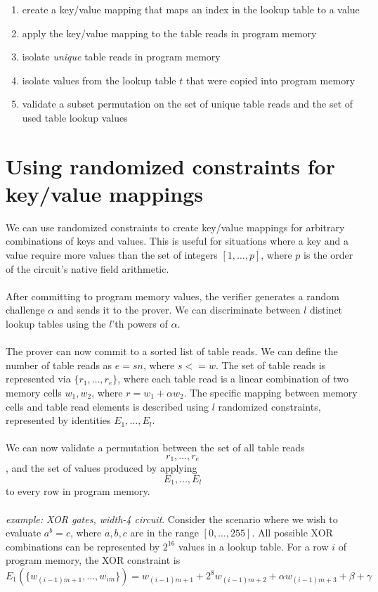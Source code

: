 \documentclass[11pt]{article} %
\begin{document}
\begin{enumerate}
	\item create a key/value mapping that maps an index in the lookup table to a value
	\item apply the key/value mapping to the table reads in program memory
	\item isolate \textit{unique} table reads in program memory
	\item isolate values from the lookup table $t$ that were copied into program memory
	\item validate a subset permutation on the set of unique table reads and the set of used table lookup values
\end{enumerate}

\section{Using randomized constraints for key/value mappings}

We can use randomized constraints to create key/value mappings for arbitrary combinations of keys and values. This is useful for situations where a key and a value require more values than the set of integers $[1, \ldots, p]$, where $p$ is the order of the circuit's native field arithmetic.
\\
\\
After committing to program memory values, the verifier generates a random challenge $\alpha$ and sends it to the prover. We can discriminate between $l$ distinct lookup tables using the $l$'th powers of $\alpha$.
\\
\\
The prover can now commit to a sorted list of table reads. We can define the number of table reads as $e = s n$, where $s <= w$. The set of table reads is represented via $\{ r_1, \ldots, r_e \}$, where each table read is a linear combination of two memory cells $w_1, w_2$, where $r = w_1 + \alpha w_2$. The specific mapping between memory cells and table read elements is described using $l$ randomized constraints, represented by identities $E_1, \ldots, E_l$.
\\
\\
We can now validate a permutation between the set of all table reads $$r_1, \ldots, r_e$$, and the set of values produced by applying $$E_1, \ldots, E_l$$ to every row in program memory.
\\
\\
\textit{example: XOR gates, width-4 circuit}. Consider the scenario where we wish to evaluate $a ^ b = c$, where $a, b, c$ are in the range $[0, \ldots, 255]$. All possible XOR combinations can be represented by $2^16$ values in a lookup table. For a row $i$ of program memory, the XOR constraint is
$$
E_1(\{w_{(i-1)m + 1}, \ldots, w_{im} \}) = w_{(i-1)m + 1} + 2^8 w_{(i-1)m + 2} + \alpha w_{(i-1)m + 3} + \beta + \gamma
$$
\end{document}

